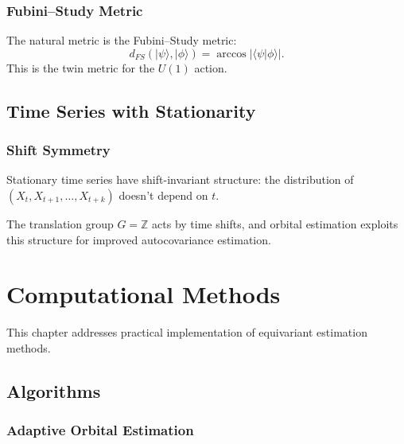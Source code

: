 \documentclass[11pt,twoside,openright]{book}
\theoremstyle{plain}
\theoremstyle{definition}
\theoremstyle{remark}
\newcommand{\Zd}{\mathbb{Z}}
\begin{document}
\subsection{Fubini--Study Metric}

The natural metric is the Fubini--Study metric:
\[
d_{FS}(|\psi\rangle, |\phi\rangle) = \arccos|\langle\psi|\phi\rangle|.
\]
This is the twin metric for the $U(1)$ action.

\section{Time Series with Stationarity}

\subsection{Shift Symmetry}

Stationary time series have shift-invariant structure: the distribution of $(X_t, X_{t+1}, \ldots, X_{t+k})$ doesn't depend on $t$.

The translation group $G = \Zd$ acts by time shifts, and orbital estimation exploits this structure for improved autocovariance estimation.


\chapter{Computational Methods}
\label{ch:computational}

This chapter addresses practical implementation of equivariant estimation methods.

\section{Algorithms}

\subsection{Adaptive Orbital Estimation}
\end{document}
